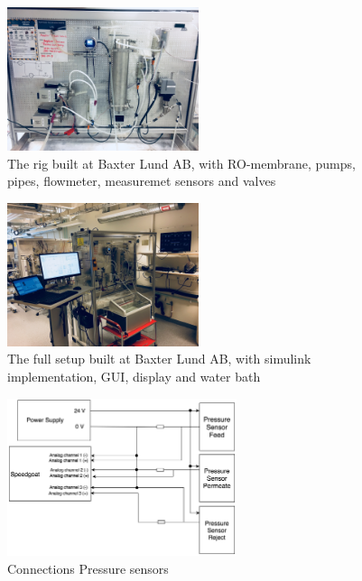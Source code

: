\begin{figure}[h]
    \centering
    \includegraphics[width=0.5\textwidth]{Rig1}
    \caption{The rig built at Baxter Lund AB, with RO-membrane, pumps, pipes, flowmeter, measuremet sensors and valves}
    \label{fig:Rig1}
\end{figure}

\begin{figure}[h]
    \centering
    \includegraphics[width=0.5\textwidth]{Rig2}
    \caption{The full setup built at Baxter Lund AB, with simulink implementation, GUI, display and water bath}
    \label{fig:Rig2}
\end{figure}


\begin{figure}[h]
    \centering
    \includegraphics[width=0.6\textwidth]{PressConn}
    \caption{Connections Pressure sensors}
    \label{fig:PressConn}
\end{figure}

\newpage

